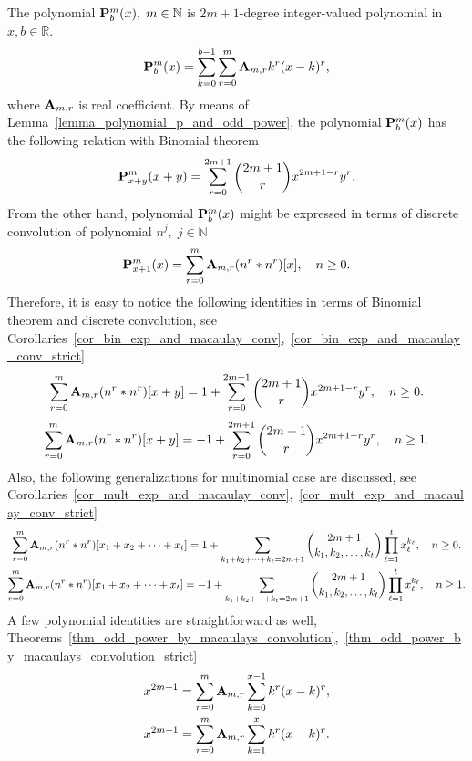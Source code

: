 The polynomial $\polynomialP{m}{b}{x}, \; m\in\mathbb{N}$ is $2m+1$-degree integer-valued polynomial in $x,b\in\mathbb{R}$.
\[
    \polynomialP{m}{b}{x} = \sum_{k=0}^{b-1} \sum_{r=0}^{m} \coeffA{m}{r} k^r(x-k)^r,
\]
where $\coeffA{m}{r}$ is real coefficient.
By means of Lemma~\ref{lemma_polynomial_p_and_odd_power},
the polynomial $\polynomialP{m}{b}{x}$ has the following relation with Binomial theorem~\cite{AbraSteg72}
\[
    \polynomialP{m}{x+y}{x+y} = \sum_{r=0}^{2m+1} \binom{2m+1}{r} x^{2m+1-r} y^r.
\]
From the other hand, polynomial $\polynomialP{m}{b}{x}$ might be expressed in terms of discrete convolution
of polynomial $n^j, \; j\in \mathbb{N}$
\[
    \polynomialP{m}{x+1}{x} = \sum_{r=0}^{m} \coeffA{m}{r} \convPower{n}{r}{x}, \quad n\geq 0.
\]
Therefore, it is easy to notice the following identities in terms of Binomial theorem and discrete convolution,
see Corollaries~\ref{cor_bin_exp_and_macaulay_conv},~\ref{cor_bin_exp_and_macaulay_conv_strict}
\begin{equation*}
    \sum_{r=0}^{m} \coeffA{m}{r} \convPower{n}{r}{x+y}
    =
    1 + \sum_{r=0}^{2m+1} \binom{2m+1}{r} x^{2m+1-r} y^r, \quad n \geq 0.
\end{equation*}
\begin{equation*}
    \sum_{r=0}^{m} \coeffA{m}{r} \convPower{n}{r}{x+y}
    =
    -1 + \sum_{r=0}^{2m+1} \binom{2m+1}{r} x^{2m+1-r} y^r, \quad n \geq 1.
\end{equation*}
Also, the following generalizations for multinomial case are discussed,
see Corollaries~\ref{cor_mult_exp_and_macaulay_conv},~\ref{cor_mult_exp_and_macaulay_conv_strict}
\begin{gather*}
    \sum_{r=0}^{m} \coeffA{m}{r} \convPower{n}{r}{\multifoldSum{t}} =
    1 + \sum_{\multifoldSum[k]{t}=2m+1} \binom{2m+1}{k_1, k_2,\ldots, k_t} \prod_{\ell=1}^{t} x_\ell^{k_\ell},
    \quad n \geq 0.\\
    \sum_{r=0}^{m} \coeffA{m}{r} \convPower{n}{r}{\multifoldSum{t}} =
    -1 + \sum_{\multifoldSum[k]{t}=2m+1} \binom{2m+1}{k_1, k_2,\ldots, k_t} \prod_{\ell=1}^{t} x_\ell^{k_\ell},
    \quad n \geq 1.\\
\end{gather*}
A few polynomial identities are straightforward as well,
Theorems~\ref{thm_odd_power_by_macaulays_convolution},~\ref{thm_odd_power_by_macaulays_convolution_strict}
\begin{gather*}
    x^{2m+1} = \sum_{r=0}^{m} \coeffA{m}{r} \sum_{k=0}^{x-1} k^r (x-k)^r,\\
    x^{2m+1} = \sum_{r=0}^{m} \coeffA{m}{r} \sum_{k=1}^{x} k^r (x-k)^r.\\
\end{gather*}

